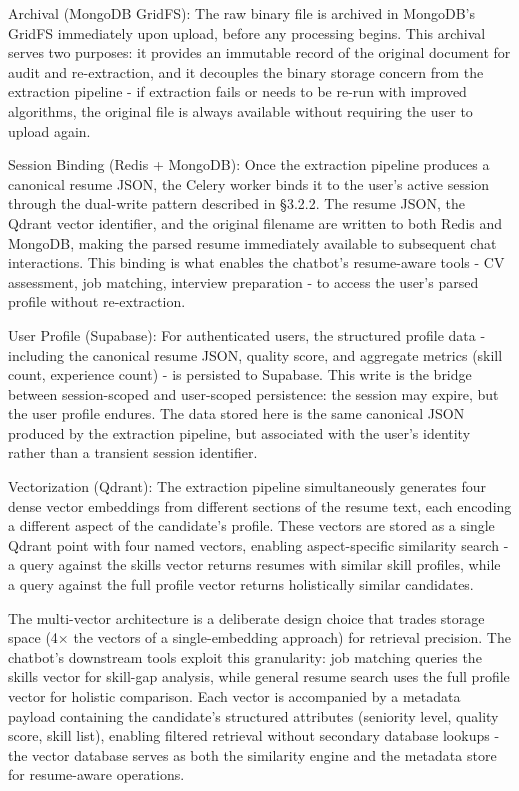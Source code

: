 \documentclass[12pt, a4paper]{report}
\begin{document}
Archival (MongoDB GridFS): The raw binary file is archived in MongoDB's GridFS immediately upon upload, before any processing begins. This archival serves two purposes: it provides an immutable record of the original document for audit and re-extraction, and it decouples the binary storage concern from the extraction pipeline - if extraction fails or needs to be re-run with improved algorithms, the original file is always available without requiring the user to upload again.

Session Binding (Redis + MongoDB): Once the extraction pipeline produces a canonical resume JSON, the Celery worker binds it to the user's active session through the dual-write pattern described in §3.2.2. The resume JSON, the Qdrant vector identifier, and the original filename are written to both Redis and MongoDB, making the parsed resume immediately available to subsequent chat interactions. This binding is what enables the chatbot's resume-aware tools - CV assessment, job matching, interview preparation - to access the user's parsed profile without re-extraction.

User Profile (Supabase): For authenticated users, the structured profile data - including the canonical resume JSON, quality score, and aggregate metrics (skill count, experience count) - is persisted to Supabase. This write is the bridge between session-scoped and user-scoped persistence: the session may expire, but the user profile endures. The data stored here is the same canonical JSON produced by the extraction pipeline, but associated with the user's identity rather than a transient session identifier.

Vectorization (Qdrant): The extraction pipeline simultaneously generates four dense vector embeddings from different sections of the resume text, each encoding a different aspect of the candidate's profile. These vectors are stored as a single Qdrant point with four named vectors, enabling aspect-specific similarity search - a query against the skills vector returns resumes with similar skill profiles, while a query against the full profile vector returns holistically similar candidates.

The multi-vector architecture is a deliberate design choice that trades storage space (4$\times$ the vectors of a single-embedding approach) for retrieval precision. The chatbot's downstream tools exploit this granularity: job matching queries the skills vector for skill-gap analysis, while general resume search uses the full profile vector for holistic comparison. Each vector is accompanied by a metadata payload containing the candidate's structured attributes (seniority level, quality score, skill list), enabling filtered retrieval without secondary database lookups - the vector database serves as both the similarity engine and the metadata store for resume-aware operations.
\end{document}
